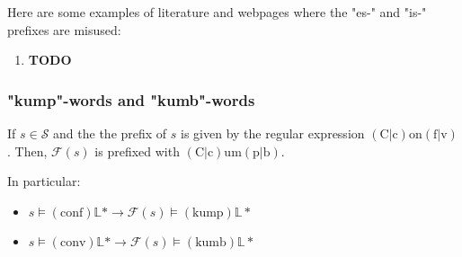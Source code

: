 \begin{example}
    Here are some examples of literature and webpages where the "es-" and "is-"
    prefixes are misused:
\end{example}

\begin{enumerate}
    \item \textbf{TODO}
\end{enumerate}

\subsubsection{"kump"-words and "kumb"-words}

If \(s\in \mathcal{S}\) and the the prefix of \(s\) is given by the
regular expression \((\text{C}|\text{c})\text{on}(\text{f}|\text{v})\). Then,
\(\mathcal{F}(s)\) is prefixed with
\((\text{C}|\text{c})\text{um}(\text{p}|\text{b})\).

In particular:
\begin{itemize}
    \item \(s \models (\text{conf})\mathbb{L}* \rightarrow \mathcal{F}(s) \models (\text{kump})\mathbb{L}*\)
    \item \(s \models (\text{conv})\mathbb{L}* \rightarrow \mathcal{F}(s) \models (\text{kumb})\mathbb{L}*\)
\end{itemize}

